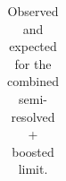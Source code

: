 \begin{table}[h]
\begin{center}
\begin{tabular}{|l|c|c|c|c|c|c|c|c|c|c|c|c|c|}
\hline
\end{tabular}
\end{center}
\caption{Observed and expected for the combined semi-resolved + boosted limit.}\label{tab:2p1limcomb}
\end{table} 
 
